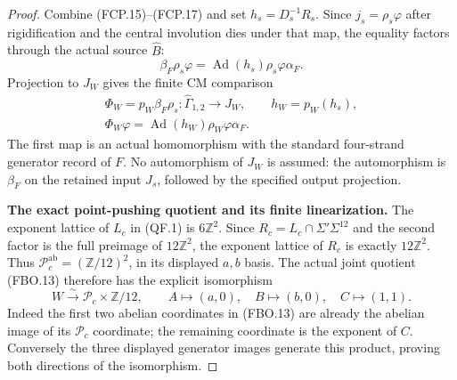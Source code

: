 \begin{proof}
Combine (FCP.15)--(FCP.17) and set $h_s=D_s^{-1}R_s$.
Since $j_s=\rho_s\varphi$ after rigidification and the
central involution dies under that map, the equality
factors through the actual source $\widehat B$:
\[
       \beta_F\rho_s\varphi
              =\operatorname{Ad}(h_s)\rho_s\varphi\alpha_F.
                                                               \tag{FCP.18}
\]
Projection to $J_W$ gives the finite CM comparison
\[
 \begin{gathered}
 \Phi_W=p_W\beta_F\rho_s:\widehat\Gamma_{1,2}\to J_W,
                         \qquad h_W=p_W(h_s),\\
 \Phi_W\varphi
               =\operatorname{Ad}(h_W)\rho_W\varphi\alpha_F.
 \end{gathered}                                                   \tag{FCP.19}
\]
The first map is an actual homomorphism with the standard
four-strand generator record of $F$.
No automorphism of $J_W$ is assumed: the automorphism
is $\beta_F$ on the retained input $J_s$, followed by
the specified output projection.

\par\medskip\noindent\textbf{The exact point-pushing quotient and its finite linearization.}\quad
The exponent lattice of $L_c$ in (QF.1) is $6\mathbb Z^2$.
Since $R_c=L_c\cap\Sigma'\Sigma^{12}$ and the second factor
is the full preimage of $12\mathbb Z^2$, the exponent lattice
of $R_c$ is exactly $12\mathbb Z^2$.
Thus $\mathcal P_c^{\mathrm{ab}}=(\mathbb Z/12)^2$, in its
displayed $a,b$ basis.  The actual joint quotient (FBO.13)
therefore has the explicit isomorphism
\[
 W\xrightarrow{\sim}\mathcal P_c\times\mathbb Z/12,
 \qquad A\mapsto(a,0),\quad B\mapsto(b,0),\quad C\mapsto(1,1).
                                                               \tag{FCP.L1}
\]
Indeed the first two abelian coordinates in (FBO.13) are
already the abelian image of its $\mathcal P_c$ coordinate;
the remaining coordinate is the exponent of $C$.
Conversely the three displayed generator images generate
this product, proving both directions of the isomorphism.


\end{proof}
